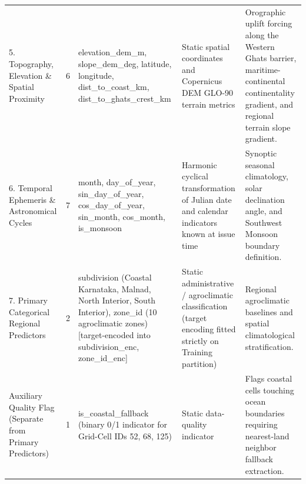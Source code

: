 \documentclass[12pt]{article}
\begin{document}
\begin{table}[htbp]
{\begin{tabular}{p{3.5cm}cp{5.5cm}p{4cm}p{5.5cm}}
5. Topography, Elevation \& Spatial Proximity & 6 & elevation\_dem\_m, slope\_dem\_deg, latitude, longitude, dist\_to\_coast\_km, dist\_to\_ghats\_crest\_km & Static spatial coordinates and Copernicus DEM GLO-90 terrain metrics & Orographic uplift forcing along the Western Ghats barrier, maritime-continental continentality gradient, and regional terrain slope gradient. \\
6. Temporal Ephemeris \& Astronomical Cycles & 7 & month, day\_of\_year, sin\_day\_of\_year, cos\_day\_of\_year, sin\_month, cos\_month, is\_monsoon & Harmonic cyclical transformation of Julian date and calendar indicators known at issue time & Synoptic seasonal climatology, solar declination angle, and Southwest Monsoon boundary definition. \\
7. Primary Categorical Regional Predictors & 2 & subdivision (Coastal Karnataka, Malnad, North Interior, South Interior), zone\_id (10 agroclimatic zones) [target-encoded into subdivision\_enc, zone\_id\_enc] & Static administrative / agroclimatic classification (target encoding fitted strictly on Training partition) & Regional agroclimatic baselines and spatial climatological stratification. \\
Auxiliary Quality Flag (Separate from Primary Predictors) & 1 & is\_coastal\_fallback (binary 0/1 indicator for Grid-Cell IDs 52, 68, 125) & Static data-quality indicator & Flags coastal cells touching ocean boundaries requiring nearest-land neighbor fallback extraction. \\
\bottomrule
\end{tabular}
}
\end{table}
\end{document}
